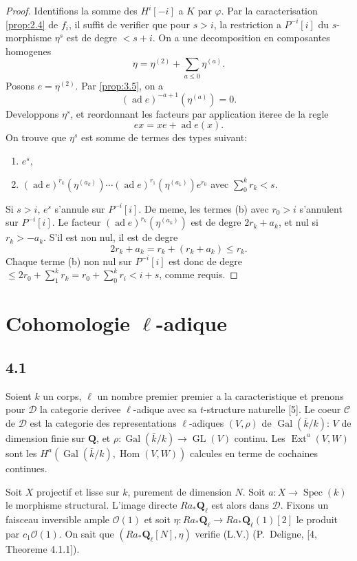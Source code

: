 \documentclass[11pt,a4paper]{article}
\theoremstyle{plain}
\theoremstyle{definition}
\DeclareMathOperator{\Ext}{Ext}
\DeclareMathOperator{\Hom}{Hom}
\DeclareMathOperator{\Spec}{Spec}
\DeclareMathOperator{\Gal}{Gal}
\DeclareMathOperator{\GL}{GL}
\newcommand{\cD}{\mathscr{D}}
\newcommand{\cC}{\mathscr{C}}
\newcommand{\bQ}{\mathbf{Q}}
\begin{document}
\begin{proof}
Identifions la somme des $H^i[-i]$ a $K$ par $\varphi$. Par la caracterisation \ref{prop:2.4} de $f_i$, il suffit de verifier que pour $s > i$, la restriction a $P^{-i}[i]$ du $s$-morphisme $\eta^s$ est de degre $< s+i$. On a une decomposition en composantes homogenes
\[
\eta = \eta^{(2)} + \sum_{a \leqslant 0} \eta^{(a)}.
\]
Posons $e = \eta^{(2)}$. Par \ref{prop:3.5}, on a
\[
(\operatorname{ad} e)^{-a+1}(\eta^{(a)}) = 0.
\]
Developpons $\eta^s$, et reordonnant les facteurs par application iteree de la regle
\[
ex = xe + \operatorname{ad} e(x).
\]
On trouve que $\eta^s$ est somme de termes des types suivant:
\begin{enumerate}[label=(\alph*)]
\item $e^s$,
\item $(\operatorname{ad} e)^{r_k}(\eta^{(a_k)}) \cdots (\operatorname{ad} e)^{r_1}(\eta^{(a_1)}) e^{r_0}$ avec $\sum_0^k r_k < s$.
\end{enumerate}
Si $s > i$, $e^s$ s'annule sur $P^{-i}[i]$. De meme, les termes (b) avec $r_0 > i$ s'annulent sur $P^{-i}[i]$. Le facteur $(\operatorname{ad} e)^{r_k}(\eta^{(a_k)})$ est de degre $2r_k + a_k$, et nul si $r_k > -a_k$. S'il est non nul, il est de degre
\[
2r_k + a_k = r_k + (r_k + a_k) \leqslant r_k.
\]
Chaque terme (b) non nul sur $P^{-i}[i]$ est donc de degre $\leqslant 2r_0 + \sum_1^k r_k = r_0 + \sum_0^k r_i < i + s$, comme requis.
\end{proof}

\section{Cohomologie $\ell$-adique}

\subsection*{4.1}
Soient $k$ un corps, $\ell$ un nombre premier premier a la caracteristique et prenons pour $\cD$ la categorie derivee $\ell$-adique avec sa $t$-structure naturelle [5]. Le coeur $\cC$ de $\cD$ est la categorie des representations $\ell$-adiques $(V,\rho)$ de $\Gal(\bar{k}/k)$: $V$ de dimension finie sur $\bQ$, et $\rho \colon \Gal(\bar{k}/k) \to \GL(V)$ continu. Les $\Ext^a(V,W)$ sont les $H^a(\Gal(\bar{k}/k), \Hom(V,W))$ calcules en terme de cochaines continues.

Soit $X$ projectif et lisse sur $k$, purement de dimension $N$. Soit $a \colon X \to \Spec(k)$ le morphisme structural. L'image directe $Ra_* \bQ_\ell$ est alors dans $\cD$. Fixons un faisceau inversible ample $\mathcal{O}(1)$ et soit $\eta \colon Ra_* \bQ_\ell \to Ra_* \bQ_\ell(1)[2]$ le produit par $c_1 \mathcal{O}(1)$. On sait que $(Ra_* \bQ_\ell[N], \eta)$ verifie (L.V.) (P.~Deligne, [4, Theoreme 4.1.1]).
\end{document}
